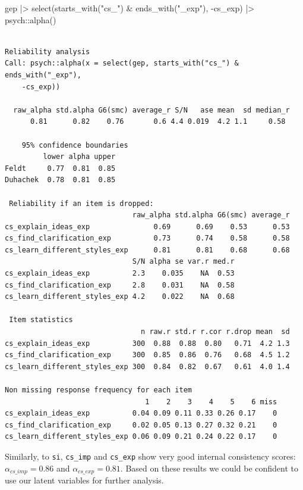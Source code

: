 \documentclass[
  letterpaper,
]{krantz}
\makeatletter
\newenvironment{Shaded}{\begin{snugshade}}{\end{snugshade}}
\newcommand{\FunctionTok}[1]{\textcolor[rgb]{0.28,0.35,0.67}{#1}}
\newcommand{\NormalTok}[1]{\textcolor[rgb]{0.00,0.23,0.31}{#1}}
\newcommand{\SpecialCharTok}[1]{\textcolor[rgb]{0.37,0.37,0.37}{#1}}
\newcommand{\StringTok}[1]{\textcolor[rgb]{0.13,0.47,0.30}{#1}}
\newenvironment{kframe}{%
\medskip{}
\setlength{\fboxsep}{.8em}
 \def\at@end@of@kframe{}%
 \ifinner\ifhmode%
  \def\at@end@of@kframe{\end{minipage}}%
  \begin{minipage}{\columnwidth}%
 \fi\fi%
 \def\FrameCommand##1{\hskip\@totalleftmargin \hskip-\fboxsep
 \colorbox{shadecolor}{##1}\hskip-\fboxsep
     \hskip-\linewidth \hskip-\@totalleftmargin \hskip\columnwidth}%
 \MakeFramed {\advance\hsize-\width
   \@totalleftmargin\z@ \linewidth\hsize
   \@setminipage}}%
 {\par\unskip\endMakeFramed%
 \at@end@of@kframe}
\renewenvironment{Shaded}{\begin{kframe}}{\end{kframe}}
\makeatother
\begin{document}
\begin{Shaded}
\begin{Highlighting}[]
\NormalTok{gep }\SpecialCharTok{|\textgreater{}}
  \FunctionTok{select}\NormalTok{(}\FunctionTok{starts\_with}\NormalTok{(}\StringTok{"cs\_"}\NormalTok{) }\SpecialCharTok{\&} \FunctionTok{ends\_with}\NormalTok{(}\StringTok{"\_exp"}\NormalTok{), }\SpecialCharTok{{-}}\NormalTok{cs\_exp) }\SpecialCharTok{|\textgreater{}}
\NormalTok{  psych}\SpecialCharTok{::}\FunctionTok{alpha}\NormalTok{()}
\end{Highlighting}
\end{Shaded}

\begin{verbatim}

Reliability analysis   
Call: psych::alpha(x = select(gep, starts_with("cs_") & ends_with("_exp"), 
    -cs_exp))

  raw_alpha std.alpha G6(smc) average_r S/N   ase mean  sd median_r
      0.81      0.82    0.76       0.6 4.4 0.019  4.2 1.1     0.58

    95% confidence boundaries 
         lower alpha upper
Feldt     0.77  0.81  0.85
Duhachek  0.78  0.81  0.85

 Reliability if an item is dropped:
                              raw_alpha std.alpha G6(smc) average_r
cs_explain_ideas_exp               0.69      0.69    0.53      0.53
cs_find_clarification_exp          0.73      0.74    0.58      0.58
cs_learn_different_styles_exp      0.81      0.81    0.68      0.68
                              S/N alpha se var.r med.r
cs_explain_ideas_exp          2.3    0.035    NA  0.53
cs_find_clarification_exp     2.8    0.031    NA  0.58
cs_learn_different_styles_exp 4.2    0.022    NA  0.68

 Item statistics 
                                n raw.r std.r r.cor r.drop mean  sd
cs_explain_ideas_exp          300  0.88  0.88  0.80   0.71  4.2 1.3
cs_find_clarification_exp     300  0.85  0.86  0.76   0.68  4.5 1.2
cs_learn_different_styles_exp 300  0.84  0.82  0.67   0.61  4.0 1.4

Non missing response frequency for each item
                                 1    2    3    4    5    6 miss
cs_explain_ideas_exp          0.04 0.09 0.11 0.33 0.26 0.17    0
cs_find_clarification_exp     0.02 0.05 0.13 0.27 0.32 0.21    0
cs_learn_different_styles_exp 0.06 0.09 0.21 0.24 0.22 0.17    0
\end{verbatim}

Similarly, to \texttt{si}, \texttt{cs\_imp} and \texttt{cs\_exp} show
very good internal consistency scores: \(\alpha_{cs\_imp} = 0.86\) and
\(\alpha_{cs\_exp} = 0.81\). Based on these results we could be
confident to use our latent variables for further analysis.
\end{document}
